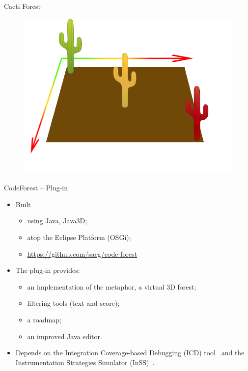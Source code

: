 \documentclass[handout]{beamer}
\begin{document}
\begin{frame}{Cacti Forest}
    \begin{figure}
        \includegraphics[width=.95\textwidth]{../figures/metaphor}
    \end{figure}
\end{frame}

\begin{frame}{CodeForest -- Plug-in}
    \begin{itemize}
        \item Built
        \begin{itemize}
            \item using Java, Java3D;
            \item atop the Eclipse Platform (OSGi);
            \item \url{https://github.com/saeg/code-forest}
        \end{itemize}
        \item The plug-in provides:
        \begin{itemize}
            \item an implementation of the metaphor, a virtual 3D forest;
            \item filtering tools (text and score);
            \item a roadmap;
            \item an improved Java editor.
        \end{itemize}
        \item Depends on the Integration Coverage-based Debugging (ICD)
        tool~\cite{souza13adding, souza2012depuracao} and the Instrumentation
        Strategies Simulator (InSS)~\cite{souza2012depuracao}.
     \end{itemize}
\end{frame}
\end{document}
